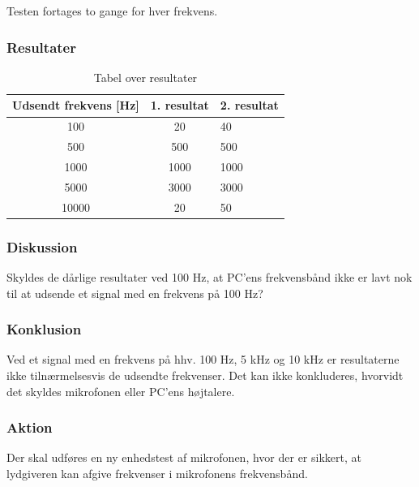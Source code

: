 			Testen fortages to gange for hver frekvens.  
		
		\subsubsection{Resultater}
		
		\begin{table}[]
				\centering
				\caption{Tabel over resultater}
				\label{bordtest5resultater}
				\begin{tabular}{lll}
					\multicolumn{1}{l|}{\textbf{Udsendt frekvens {[}Hz{]}}} & 	
					\multicolumn{1}{l|}{\textbf{1. resultat}} & \textbf{2. resultat} \\ \hline
					\multicolumn{1}{c|}{100}& 
					\multicolumn{1}{c|}{20}&40\\
					\multicolumn{1}{c|}{500}& 
					\multicolumn{1}{c|}{500}&500\\
					\multicolumn{1}{c|}{1000}& 
					\multicolumn{1}{c|}{1000}&1000\\
					\multicolumn{1}{c|}{5000}& 
					\multicolumn{1}{c|}{3000}&3000\\
					\multicolumn{1}{c|}{10000}& 
					\multicolumn{1}{c|}{20}&50\\
                   
				\end{tabular}
			\end{table}
		
		\subsubsection{Diskussion} 
		Skyldes de dårlige resultater ved 100 Hz, at PC'ens frekvensbånd ikke er lavt nok til at udsende et signal med en frekvens på 100 Hz? 
		\subsubsection{Konklusion}
	Ved et signal med en frekvens på hhv. 100 Hz, 5 kHz og 10 kHz er resultaterne ikke tilnærmelsesvis de udsendte frekvenser. 
	Det kan ikke konkluderes, hvorvidt det skyldes mikrofonen eller PC'ens højtalere. 
		\subsubsection{Aktion}
		Der skal udføres en ny enhedstest af mikrofonen, hvor der er sikkert, at lydgiveren kan afgive frekvenser i mikrofonens frekvensbånd. 
		


